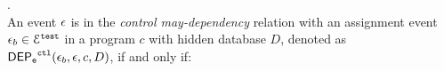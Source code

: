 \begin{defn}
\label{def:event_ctldep}.
\\
An event $\mathtt{\epsilon}$ is in the \emph{control may-dependency} relation with an assignment
event $\mathtt{\epsilon}_b \in \mathcal{E}^{\mathtt{{test}}}$ in a program ${c}$
with hidden database $D$, denoted as 
%
%
%
\\
$\mathsf{DEP_{\mathtt{e}}}^{\mathtt{{ctl}}}(\mathtt{\epsilon}_b, \mathtt{\epsilon}, c, D)$, if and only if: 
%

\end{defn}
